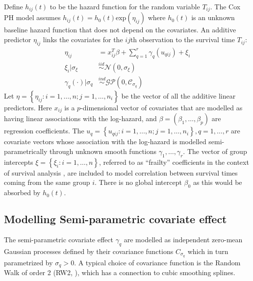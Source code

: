 \documentclass[ba]{imsart}
\begin{document}
Define $h_{ij}(t)$ to be the hazard function for the random variable $T_{ij}$. The Cox PH model assumes $h_{ij}(t) = h_0(t)\text{exp}(\eta_{ij})$ where $h_0(t)$ is an unknown baseline hazard function that does not depend on the covariates. An additive predictor $\eta_{ij}$ links the covariates for the $ij$th observation to the survival time $T_{ij}$:
\begin{equation}\begin{aligned}\label{eqn:eta}
\eta_{ij} &=x_{ij}^{T}\beta+\sum_{q=1}^{r} \gamma_q(u_{qij}) +\xi_{i} \\
\xi_i | \sigma_{\xi} &\overset{iid}{\sim} \mathcal{N}(0,\sigma_{\xi}) \\
\gamma_{q}(\cdot)|\sigma_{q} &\overset{ind}{\sim} \mathcal{GP}\left(0,\mathcal{C}_{\sigma_q}\right)
\end{aligned}\end{equation}
Let $\eta = \left\{ \eta_{ij}: i = 1,\ldots,n; j = 1,\ldots,n_{i}\right\}$ be the vector of all the additive linear predictors. Here $x_{ij}$ is a $p$-dimensional vector of covariates that are modelled as having linear associations with the log-hazard, and $\beta = (\beta_{1},\ldots,\beta_{p})$ are regression coefficients. The $u_{q} = \left\{u_{qij}: i = 1,\ldots,n; j = 1,\ldots,n_{i} \right\}, q = 1,\ldots,r$ are covariate vectors whose association with the log-hazard is modelled semi-parametrically through unknown smooth functions $\gamma_1,\ldots,\gamma_r$. The vector of group intercepts $\xi = \left\{ \xi_{i}: i=1,\ldots,n\right\}$, referred to as ``frailty'' coefficients in the context of survival analysis \citep{frailty}, are included to model correlation between survival times coming from the same group $i$. There is no global intercept $\beta_{0}$ as this would be absorbed by $h_{0}(t)$.

\subsection{Modelling Semi-parametric covariate effect}\label{subsec:smooth}
The semi-parametric covariate effect $\gamma_q$ are modelled as independent zero-mean Gaussian processes defined by their covariance functions $C_{\sigma_{q}}$ which in turn parametrized by $\sigma_q > 0$. A typical choice
of covariance function is the Random Walk of order 2 (RW2, \citet{rw2}), which has a connection to cubic smoothing splines.
\end{document}
